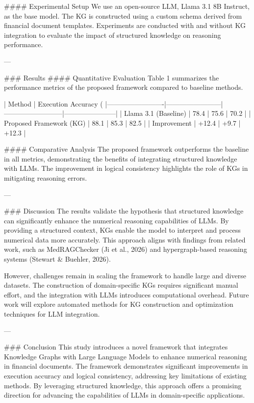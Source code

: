 #### Experimental Setup  
We use an open-source LLM, Llama 3.1 8B Instruct, as the base model. The KG is constructed using a custom schema derived from financial document templates. Experiments are conducted with and without KG integration to evaluate the impact of structured knowledge on reasoning performance.

---

### Results  
#### Quantitative Evaluation  
Table 1 summarizes the performance metrics of the proposed framework compared to baseline methods.

| Method                  | Execution Accuracy (%
|-------------------------|------------------------|--------------------------|-----------------------|
| Llama 3.1 (Baseline)    | 78.4                  | 75.6                    | 70.2                 |
| Proposed Framework (KG) | 88.1                  | 85.3                    | 82.5                 |
| Improvement             | +12.4                 | +9.7                    | +12.3                |

#### Comparative Analysis  
The proposed framework outperforms the baseline in all metrics, demonstrating the benefits of integrating structured knowledge with LLMs. The improvement in logical consistency highlights the role of KGs in mitigating reasoning errors.

---

### Discussion  
The results validate the hypothesis that structured knowledge can significantly enhance the numerical reasoning capabilities of LLMs. By providing a structured context, KGs enable the model to interpret and process numerical data more accurately. This approach aligns with findings from related work, such as MedRAGChecker (Ji et al., 2026) and hypergraph-based reasoning systems (Stewart & Buehler, 2026).

However, challenges remain in scaling the framework to handle large and diverse datasets. The construction of domain-specific KGs requires significant manual effort, and the integration with LLMs introduces computational overhead. Future work will explore automated methods for KG construction and optimization techniques for LLM integration.

---

### Conclusion  
This study introduces a novel framework that integrates Knowledge Graphs with Large Language Models to enhance numerical reasoning in financial documents. The framework demonstrates significant improvements in execution accuracy and logical consistency, addressing key limitations of existing methods. By leveraging structured knowledge, this approach offers a promising direction for advancing the capabilities of LLMs in domain-specific applications.

